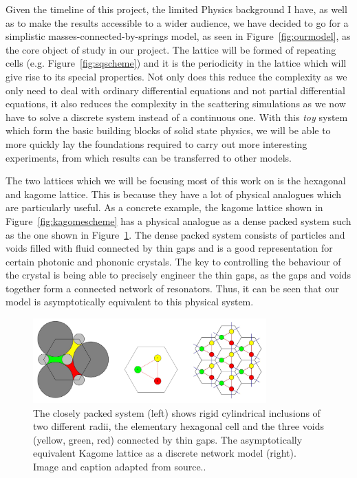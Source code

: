 Given the timeline of this project, the limited Physics background I have, as
well as to make the results accessible to a wider audience, we have decided to
go for a simplistic masses-connected-by-springs model, as seen in
Figure~\ref{fig:ourmodel}, as the core object of study in our project. The
lattice will be formed of repeating cells (e.g. Figure~\ref{fig:sqscheme}) and
it is the periodicity in the lattice which will give rise to its special
properties. Not only does this reduce the complexity as we only need to deal
with ordinary differential equations and not partial differential equations, it
also reduces the complexity in the scattering simulations as we now have to
solve a discrete system instead of a continuous one. With this \textit{toy}
system which form the basic building blocks of solid state physics, we will be
able to more quickly lay the foundations required to carry out more interesting
experiments, from which results can be transferred to other models.

The two lattices which we will be focusing most of this work on is the
hexagonal and kagome lattice. This is because they have a lot of physical
analogues which are particularly useful.\cite{singlevalley,wuandhu,kphysical}
As a concrete example, the kagome lattice shown in
Figure~\ref{fig:kagomescheme} has a physical analogue as a dense packed system
such as the one shown in Figure~\ref{fig:kagomephysical}. The dense packed
system consists of particles and voids filled with fluid connected by thin
gaps and is a good representation for certain photonic and phononic crystals.
The key to controlling the behaviour of the crystal is being able to precisely
engineer the thin gaps, as the gaps and voids together form a connected network
of resonators. Thus, it can be seen that our model is asymptotically equivalent
to this physical system.\cite{kphysical}

\begin{figure}[!h]
\centering
\includegraphics[width=0.8\textwidth]{imgs/kagomephysical.PNG}
\caption{\label{fig:kagomephysical} The closely packed system (left) shows
rigid cylindrical inclusions of two different radii, the elementary hexagonal
cell and the three voids (yellow, green, red) connected by thin gaps. The
asymptotically equivalent Kagome lattice as a discrete network model (right).
Image and caption adapted from source.\cite{kphysical}.}
\end{figure}

